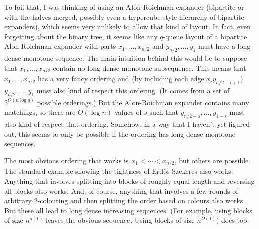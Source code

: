 \documentclass{patmorin}
\begin{document}
To foil that, I was thinking of using an Alon-Roichman expander (bipartite or with the halves merged, possibly even a hypercube-style hierarchy of bipartite expanders), which seems very unlikely to allow that kind of layout.  In fact, even forgetting about the binary tree, it seems like any $q$-queue layout of a bipartite Alon-Roichman expander with parts $x_1,\ldots,x_{n/2}$ and $y_{n/2},\ldots,y_{1}$ must have a long dense monotone sequence.   The main intuition behind this would be to suppose that $x_1,\ldots,x_{n/2}$ contain no long dense monotone subsequence.  This means that $x_1,\ldots,x_{n/2}$ has a very fancy ordering and (by including each edge $x_iy_{n/2-i+1}$) $y_{n/2},\ldots,y_{1}$ must also kind of respect this ordering.  (It comes from a set of $2^{O(n\log q)}$ possible orderings.)  But the Alon-Roichman expander contains many matchings, so there are $O(\log n)$ values of $s$ such that $y_{n/2-s},\ldots,y_{1-s}$ must also kind of respect that ordering.   Somehow, in a way that I haven't yet figured out, this seems to only be possible if the ordering has long dense monotone sequences.

The most obvious ordering that works is $x_1<\cdots<x_{n/2}$, but others are possible. The standard example showing the tightness of Erd\H{o}s-Szekeres also works.  Anything that involves splitting into blocks of roughly equal length and reversing all blocks also works.  And, of course, anything that involves a few rounds of arbitrary $2$-colouring and then splitting the order based on colours also works.  But these all lead to long dense increasing sequences.  (For example, using blocks of size $n^{o(1)}$ leaves the obvious sequence.  Using blocks of size $n^{\Omega(1)})$ does too.
\end{document}
